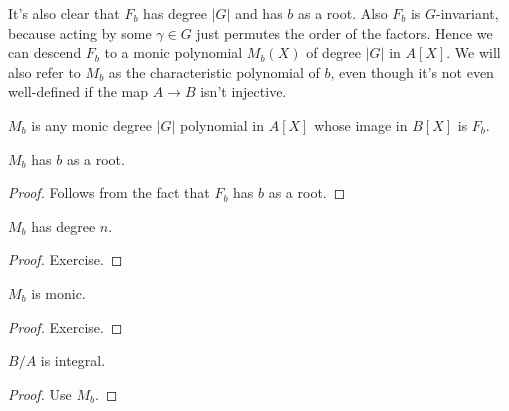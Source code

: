 It's also clear that $F_b$ has degree $|G|$ and has $b$ as a root.
Also $F_b$ is $G$-invariant, because acting by some $\gamma\in G$
just permutes the order of the factors. Hence we can descend $F_b$
to a monic polynomial $M_b(X)$ of degree $|G|$ in $A[X]$. We will
also refer to $M_b$ as the characteristic polynomial of $b$, even though
it's not even well-defined if the map $A\to B$ isn't injective.

\begin{definition}
  \label{MulSemiringAction.CharacteristicPolynomial.M}
  \leanok
  $M_b$ is any monic degree $|G|$ polynomial in $A[X]$ whose
  image in $B[X]$ is $F_b$.
\end{definition}

\begin{lemma}
  \label{MulSemiringAction.CharacteristicPolynomial.M_eval_eq_zero}
  \leanok
  $M_b$ has $b$ as a root.
\end{lemma}
\begin{proof}
  \leanok
  Follows from the fact that $F_b$ has $b$ as a root.
\end{proof}
\begin{lemma}
  \label{MulSemiringAction.CharacteristicPolynomial.M_deg}
  \leanok
  $M_b$ has degree $n$.
\end{lemma}
\begin{proof}
  \leanok
  Exercise.
\end{proof}
\begin{lemma}
  \label{MulSemiringAction.CharacteristicPolynomial.M_monic}
  \leanok
  $M_b$ is monic.
\end{lemma}
\begin{proof}
  \leanok
  Exercise.
\end{proof}

\begin{theorem}
  \label{MulSemiringAction.CharacteristicPolynomial.isIntegral}
  \leanok
  $B/A$ is integral.
\end{theorem}
\begin{proof}
  \leanok
  Use $M_b$.
\end{proof}

